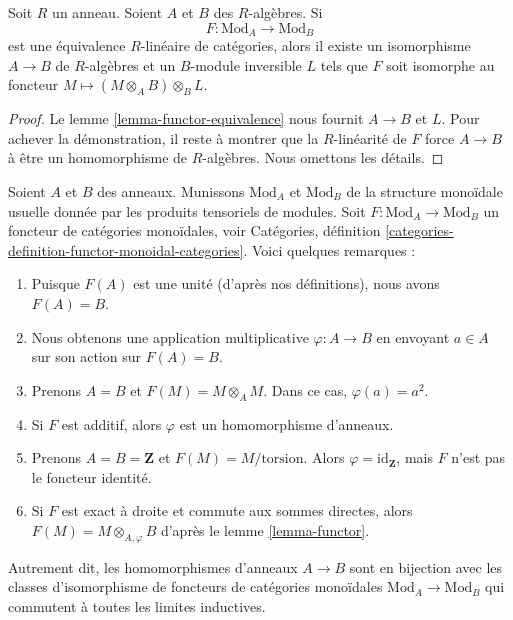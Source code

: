 \begin{lemma}
\label{lemma-functor-equivalence-linear}
Soit $R$ un anneau. Soient $A$ et $B$ des $R$-algèbres. Si
$$
F : \text{Mod}_A \longrightarrow \text{Mod}_B
$$
est une équivalence $R$-linéaire de catégories, alors il existe
un isomorphisme $A \to B$ de $R$-algèbres et un $B$-module inversible $L$ tels que
$F$ soit isomorphe au foncteur $M \mapsto (M \otimes_A B) \otimes_B L$.
\end{lemma}

\begin{proof}
Le lemme \ref{lemma-functor-equivalence} nous fournit $A \to B$ et $L$.
Pour achever la démonstration, il reste à montrer que la $R$-linéarité
de $F$ force $A \to B$ à être un homomorphisme de $R$-algèbres. Nous omettons les détails.
\end{proof}

\begin{remark}
\label{remark-monoidal}
Soient $A$ et $B$ des anneaux. Munissons $\text{Mod}_A$ et $\text{Mod}_B$
de la structure monoïdale usuelle donnée par les produits tensoriels de modules.
Soit $F : \text{Mod}_A \to \text{Mod}_B$ un foncteur de
catégories monoïdales, voir
Catégories, définition \ref{categories-definition-functor-monoidal-categories}.
Voici quelques remarques :
\begin{enumerate}
\item Puisque $F(A)$ est une unité (d'après nos définitions), nous avons $F(A) = B$.
\item Nous obtenons une application multiplicative $\varphi : A \to B$
en envoyant $a \in A$ sur son action sur $F(A) = B$.
\item Prenons $A = B$ et $F(M) = M \otimes_A M$. Dans ce cas, $\varphi(a) = a^2$.
\item Si $F$ est additif, alors $\varphi$ est un homomorphisme d'anneaux.
\item Prenons $A = B = \mathbf{Z}$ et $F(M) = M/\text{torsion}$. Alors
$\varphi = \text{id}_\mathbf{Z}$, mais $F$ n'est pas le foncteur identité.
\item Si $F$ est exact à droite et commute aux sommes directes,
alors $F(M) = M \otimes_{A, \varphi} B$ d'après le lemme \ref{lemma-functor}.
\end{enumerate}
Autrement dit, les homomorphismes d'anneaux $A \to B$ sont en bijection avec les classes d'isomorphisme
de foncteurs de catégories monoïdales $\text{Mod}_A \to \text{Mod}_B$
qui commutent à toutes les limites inductives.
\end{remark}





